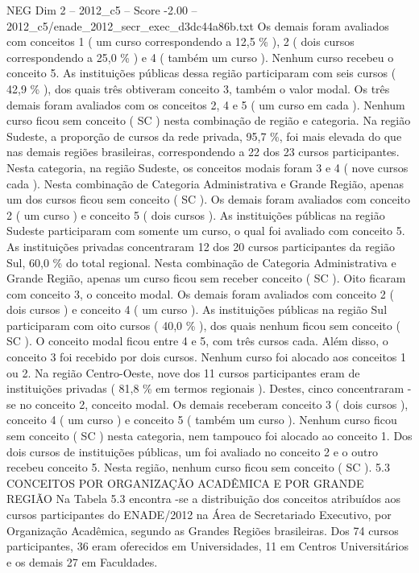 \begin{textsample}{NEG Dim 2 – 2012\_c5 – Score -2.00 – 2012\_c5/enade\_2012\_secr\_exec\_d3dc44a86b.txt}
Os demais foram avaliados com conceitos 1 ( um curso correspondendo a 12,5 \% ), 2 ( dois cursos correspondendo a 25,0 \% ) e 4 ( também um curso ).
Nenhum curso recebeu o conceito 5.
As instituições públicas dessa região participaram com seis cursos ( 42,9 \% ), dos quais três obtiveram conceito 3, também o valor modal.
Os três demais foram avaliados com os conceitos 2, 4 e 5 ( um curso em cada ).
Nenhum curso ficou sem conceito ( SC ) nesta combinação de região e categoria.
Na região Sudeste, a proporção de cursos da rede privada, 95,7 \%, foi mais elevada do que nas demais regiões brasileiras, correspondendo a 22 dos 23 cursos participantes.
Nesta categoria, na região Sudeste, os conceitos modais foram 3 e 4 ( nove cursos cada ).
Nesta combinação de Categoria Administrativa e Grande Região, apenas um dos cursos ficou sem conceito ( SC ).
Os demais foram avaliados com conceito 2 ( um curso ) e conceito 5 ( dois cursos ).
As instituições públicas na região Sudeste participaram com somente um curso, o qual foi avaliado com conceito 5.
As instituições privadas concentraram 12 dos 20 cursos participantes da região Sul, 60,0 \% do total regional.
Nesta combinação de Categoria Administrativa e Grande Região, apenas um curso ficou sem receber conceito ( SC ).
Oito ficaram com conceito 3, o conceito modal.
Os demais foram avaliados com conceito 2 ( dois cursos ) e conceito 4 ( um curso ).
As instituições públicas na região Sul participaram com oito cursos ( 40,0 \% ), dos quais nenhum ficou sem conceito ( SC ).
O conceito modal ficou entre 4 e 5, com três cursos cada.
Além disso, o conceito 3 foi recebido por dois cursos.
Nenhum curso foi alocado aos conceitos 1 ou 2.
Na região Centro-Oeste, nove dos 11 cursos participantes eram de instituições privadas ( 81,8 \% em termos regionais ).
Destes, cinco concentraram -se no conceito 2, conceito modal.
Os demais receberam conceito 3 ( dois cursos ), conceito 4 ( um curso ) e conceito 5 ( também um curso ).
Nenhum curso ficou sem conceito ( SC ) nesta categoria, nem tampouco foi alocado ao conceito 1.
Dos dois cursos de instituições públicas, um foi avaliado no conceito 2 e o outro recebeu conceito 5.
Nesta região, nenhum curso ficou sem conceito ( SC ). 5.3 CONCEITOS POR ORGANIZAÇÃO ACADÊMICA E POR GRANDE REGIÃO Na Tabela 5.3 encontra -se a distribuição dos conceitos atribuídos aos cursos participantes do ENADE/2012 na Área de Secretariado Executivo, por Organização Acadêmica, segundo as Grandes Regiões brasileiras.
Dos 74 cursos participantes, 36 eram oferecidos em Universidades, 11 em Centros Universitários e os demais 27 em Faculdades.

\end{textsample}
